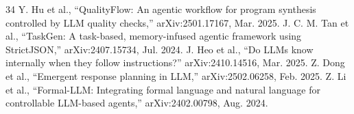 \documentclass[10pt,conference]{IEEEtran}
\begin{document}
\begin{thebibliography}{34}
 Y. Hu et al., ``QualityFlow: An agentic workflow for program synthesis controlled by LLM quality checks,'' arXiv:2501.17167, Mar. 2025.
 J. C. M. Tan et al., ``TaskGen: A task-based, memory-infused agentic framework using StrictJSON,'' arXiv:2407.15734, Jul. 2024.
 J. Heo et al., ``Do LLMs know internally when they follow instructions?'' arXiv:2410.14516, Mar. 2025.
 Z. Dong et al., ``Emergent response planning in LLM,'' arXiv:2502.06258, Feb. 2025.
 Z. Li et al., ``Formal-LLM: Integrating formal language and natural language for controllable LLM-based agents,'' arXiv:2402.00798, Aug. 2024.
\end{thebibliography}
\end{document}
